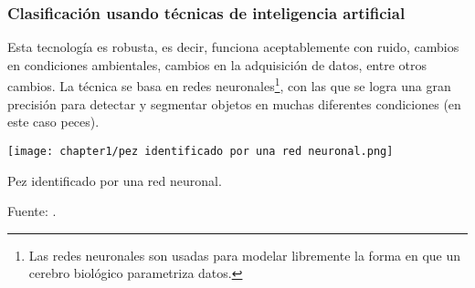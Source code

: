 \subsubsection{Clasificación usando técnicas de inteligencia artificial}

Esta tecnología es robusta, es decir, funciona aceptablemente con ruido, cambios en condiciones ambientales, cambios en la adquisición de datos, entre otros cambios. La técnica se basa en redes neuronales\footnote{Las redes neuronales son usadas para modelar libremente la forma en que un cerebro biológico parametriza datos.}, con las que se logra una gran precisión para detectar y segmentar objetos en muchas diferentes condiciones (en este caso peces).\\

\begin{myfigure}[H]
	\footnotesize\centering
	\texttt{[image: chapter1/pez identificado por una red neuronal.png]}
	\caption{Pez identificado por una red neuronal.}
	\begin{myflushcenter}
		Fuente: \citep{Varalakshmi2019}.
	\end{myflushcenter}	
	\label{fig:pez identificado por una red neuronal}
\end{myfigure}



